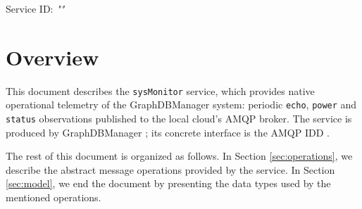 \documentclass[a4paper]{arrowhead}
\begin{document}
\sloppy

\ArrowheadSetup

\begin{center}
  \vspace*{1cm}
  \huge{\arrowtitle}

  \vspace*{0.2cm}
  \LARGE{\arrowtype}
  \vspace*{1cm}

  \Large{Service ID: \textit{"\arrowid"}}

  \vspace*{\fill}


  \vspace*{1cm}
  \vspace*{\fill}

  \begin{abstract}
    This document describes the native \texttt{sysMonitor} service, version 1.0.0, produced by the GraphDBManager support system of Arrowhead 5.2.2.
  \end{abstract}

  \vspace*{1cm}
\end{center}

\newpage

\tableofcontents
\newpage

\section{Overview}
\label{sec:overview}

This document describes the \texttt{sysMonitor} service, which provides native operational telemetry of the GraphDBManager system: periodic \texttt{echo}, \texttt{power} and \texttt{status} observations published to the local cloud's AMQP broker.
The service is produced by GraphDBManager \cite{gdm-sysd}; its concrete interface is the AMQP IDD \cite{gdm-sysMonitor-amqp-idd}.

The rest of this document is organized as follows.
In Section \ref{sec:operations}, we describe the abstract message operations provided by the service.
In Section \ref{sec:model}, we end the document by presenting the data types used by the mentioned operations.
\end{document}

